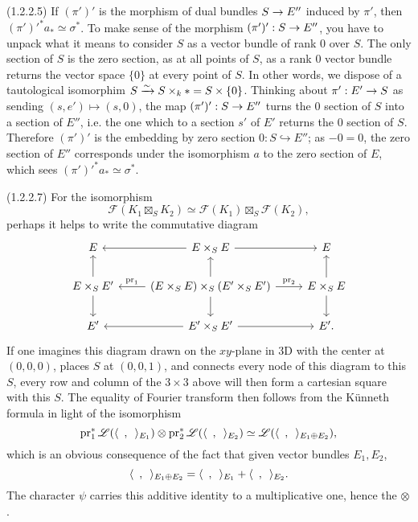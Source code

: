 \documentclass[deligne.tex]{subfiles}
\begin{document}
(1.2.2.5)
If $(\pi')'$ is the morphism of dual 
bundles $S\rightarrow E''$ induced by $\pi'$, then $(\pi')'^*a_*\simeq\sigma^*$.
To make sense of the morphism $(\pi')':S\rightarrow E''$, you have to unpack what it
means to consider $S$ as a vector bundle of rank 0 over $S$. 
The only section of $S$ is the zero section, as at all points of $S$, as a
rank 0 vector bundle returns the vector space $\{0\}$ at every point of $S$.
In other words, we dispose of a tautological isomorphim
$S\xrightarrow\sim S\times_k*=S\times\{0\}$.
Thinking about $\pi':E'\rightarrow S$ as sending $(s,e')\mapsto (s,0)$,
the map $(\pi')':S\rightarrow E''$ turns the 0 section of $S$ into a
section of $E''$, i.e. the one which to a section $s'$ of $E'$ returns the 0 
section of $S$. Therefore $(\pi')'$ is the embedding by zero section
$0:S\hookrightarrow E''$; as $-0=0$, the zero section of $E''$
corresponds under the isomorphism $a$ to the zero section of $E$, which
sees $(\pi')'^*a_*\simeq\sigma^*$.

(1.2.2.7) For the isomorphism
\begin{equation*}
	\mathscr F(K_1\boxtimes_SK_2)\simeq\mathscr F(K_1)\boxtimes_S\mathscr F(K_2),
\end{equation*}
perhaps it helps to write the commutative diagram
\begin{equation*}\begin{tikzcd}
	E&E\times_SE\arrow[l]\arrow[r]&E \\
	E\times_SE'\arrow[u]\arrow[d]&(E\times_SE)\times_S(E'\times_SE')\arrow[l,"\pr_1"']\arrow[r,"\pr_2"]\arrow[u]\arrow[d]&E\times_SE\arrow[u]\arrow[d] \\
	E'&E'\times_SE'\arrow[l]\arrow[r]&E'.
\end{tikzcd}\end{equation*}
If one imagines this diagram drawn on the $xy$-plane in 3D with the center
at $(0,0,0)$, places $S$ at $(0,0,1)$, and connects every node of this
diagram to this $S$, every row and column of the $3\times3$ above will then
form a cartesian square with this $S$.
The equality of Fourier transform then follows from the Künneth formula
in light of the isomorphism
\begin{equation*}
	\operatorname{pr}_1^*\mathscr L(\langle\enskip,\enskip\rangle_{E_1})
	\otimes\operatorname{pr}_2^*\mathscr L(\langle\enskip,\enskip\rangle_{E_2})
	\simeq\mathscr L(\langle\enskip,\enskip\rangle_{E_1\oplus E_2}),
\end{equation*}
which is an obvious consequence of the fact that given vector bundles
$E_1,E_2$,
\begin{equation*}
	\langle\enskip,\enskip\rangle_{E_1\oplus E_2}
	=\langle\enskip,\enskip\rangle_{E_1}+\langle\enskip,\enskip\rangle_{E_2}.
\end{equation*}
The character $\psi$ carries this additive identity to a multiplicative 
one, hence the $\otimes$.
\end{document}
